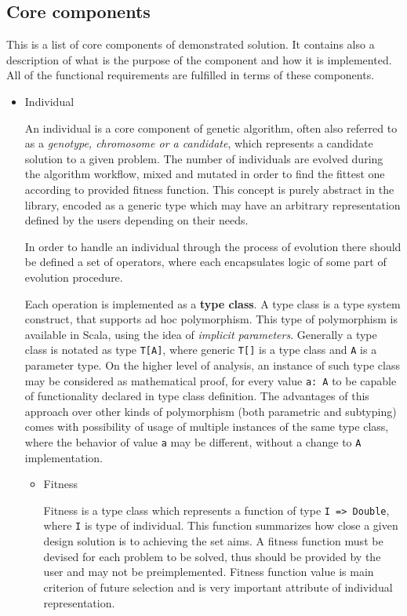 \subsection{Core components}

This is a list of core components of demonstrated solution. It contains also a description of what is the purpose of the component and how it is implemented. All of the functional requirements are fulfilled in terms of these components.

\begin{itemize}

\item
Individual

An individual is a core component of genetic algorithm, often also referred to as a \textit{genotype, chromosome \emph{or} a candidate}, which represents a candidate solution to a given problem. The number of individuals are evolved during the algorithm workflow, mixed and mutated in order to find the fittest one according to provided fitness function. This concept is purely abstract in the library, encoded as a generic type which may have an arbitrary representation defined by the users depending on their needs. 

In order to handle an individual through the process of evolution there should be defined a set of operators, where each encapsulates logic of some part of evolution procedure. 

Each operation is implemented as a \textbf{type class}. A type class is a type system construct, that supports ad hoc polymorphism. This type of polymorphism is available in Scala, using the idea of \textit{implicit parameters}. Generally a type class is notated as type \texttt{T[A]}, where generic \texttt{T[]} is a type class and \texttt{A} is a parameter type. On the higher level of analysis, an instance of such type class may be considered as mathematical proof, for every value \texttt{a: A} to be capable of functionality declared in type class definition. The advantages of this approach over other kinds of polymorphism (both parametric and subtyping) comes with possibility of usage of multiple instances of the same type class, where the behavior of value \texttt{a} may be different, without a change to \texttt{A} implementation.
\medbreak

\begin{itemize}
\item
Fitness

Fitness is a type class which represents a function of type \texttt{I => Double}, where \texttt{I} is type of individual. This function summarizes how close a given design solution is to achieving the set aims. A fitness function must be devised for each problem to be solved, thus should be provided by the user and may not be preimplemented. Fitness function value is main criterion of future selection and is very important attribute of individual representation.


\end{itemize}
\end{itemize}
